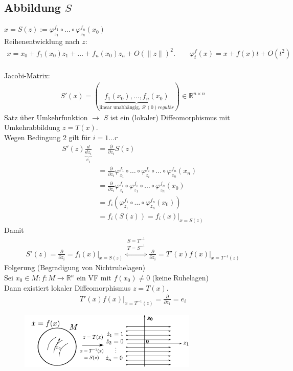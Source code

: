 \documentclass[ngerman]{tudscrreprt}
\begin{document}
\subsection*{Abbildung $S$} $x = S(z):=\varphi_{z_1}^{f_1} \circ \dots \circ \varphi_{z_n}^{f_n}(x_0)$ \\ 
Reihenentwicklung nach $z$: \begin{align*} x = x_0 + f_1(x_0) z_1 + \dots + f_n(x_0)z_n + O(\|z\|)^2. \qquad \varphi_t^f(x) = x+ f(x)t + O(t^2)\end{align*}
\\Jacobi-Matrix: \begin{align*} S'(x) = \left( \underbrace{f_1(x_0),\dots, f_n(x_0)}_{\text{linear unabhängig, }S'(0) regulär} \right)\in \mathbb{R}^{n\times n} \end{align*}
Satz über Umkehrfunktion $\to$ $S$ ist ein (lokaler) Diffeomorphismus mit Umkehrabbildung $z = T(x).$\\ 
Wegen Bedingung 2 gilt für $i = 1 \dots r$ \begin{align*} S'(z)\underbrace{\frac{d}{dz_i}}_{e_i} &= \frac{\partial}{\partial z_i}S(z)\\ &=\frac{\partial}{\partial z_i} \varphi_{z_1}^{f_1} \circ \dots \circ \varphi_{z_i}^{f_i} \circ \dots \circ \varphi_{z_n}^{f_n}(x_n)\\ &=\frac{\partial}{\partial z_i}\varphi_{z_i}^{f_i} \circ \varphi_{z_1}^{f_i} \circ \dots \circ \varphi_{z_n}^{f_n}(x_0) \\ &=f_i \left( \varphi_{z_1}^{f_1}\circ \dots \circ \varphi_{z_n}^{f_n}(x_0) \right)\\ &=f_i\left.\left( S(z) \right) = f_i(x)\right|_{x= S(z)}  \end{align*}
Damit 
\begin{align*} S'(z) = \frac{\partial}{\partial z_i} =\left. f_i(x)\right|_{x= S(z)} \overset{\substack{S = T^{-1}\\ T = S^{-1}}}{\iff} \frac{\partial}{\partial z_i} = \left.T'(x)f(x)\right|_{x = T^{-1}(z)} \end{align*}
Folgerung (Begradigung von Nichtruhelagen)\\ 
Sei $x_0\in M: f: M\to \mathbb{R}^n$ ein VF mit $f(x_0)\ne 0$ (keine Ruhelagen)\\ 
Dann existiert lokaler Diffeomorphismus $z = T(x)$. \begin{align*} T'(x) f(x)|_{x = T^{-1}(z)} = \frac{\partial}{\partial z_1} = e_i \end{align*}
\begin{figure}[H]
\centering
\def\svgwidth{200pt} 
  \includegraphics[width=8.5cm]{images/Zeichnung1.pdf}
\end{figure}
\end{document}
